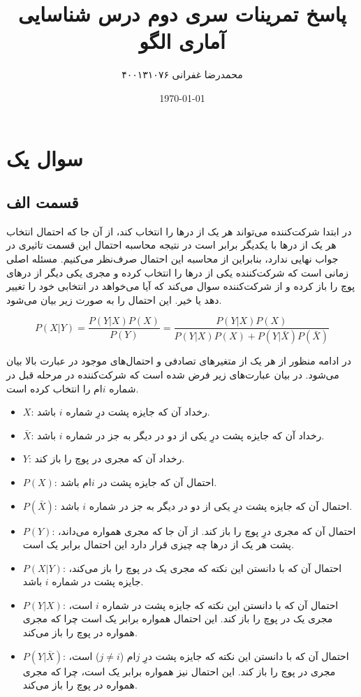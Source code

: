 \documentclass{article}
\title{\vspace{-4cm} \textbf{پاسخ تمرینات سری دوم درس شناسایی آماری الگو}}
\author{محمدرضا غفرانی  ۴۰۰۱۳۱۰۷۶}
\date{\today}
\begin{document}
\maketitle

\section*{سوال یک}

\subsection*{قسمت الف}

در ابتدا شرکت‌کننده می‌تواند هر یک از در‌ها را انتخاب کند، از آن جا که احتمال انتخاب هر یک از در‌ها با
یکدیگر برابر است در نتیجه محاسبه احتمال این قسمت تاثیری در جواب نهایی ندارد، بنابراین از
محاسبه این احتمال صرف‌نظر می‌کنیم. مسئله اصلی زمانی است که شرکت‌کننده یکی از در‌ها را انتخاب کرده و
مجری یکی دیگر از در‌های پوچ را باز کرده و از شرکت‌کننده سوال می‌کند که آیا
می‌خواهد در انتخابی خود را تغییر دهد یا خیر. این احتمال را به صورت زیر بیان می‌شود.

$$P(X|Y) = \frac{P(Y|X) P(X)}{P(Y)} = \frac{P(Y|X) P(X)}{P(Y|X) P(X) + P(Y|\bar{X})P(\bar{X})}$$

در ادامه منظور از هر یک از متغیر‌های تصادفی و احتمال‌های موجود در عبارت بالا بیان می‌شود. در بیان عبارت‌های
زیر فرض شده است که شرکت‌کننده در مرحله قبل در شماره $i$ام را انتخاب کرده است.

\begin{itemize}
    \item $X$: رخداد آن که جایزه پشت درِ شماره $i$ باشد.
    \item $\bar{X}$: رخداد آن که جایزه پشت درِ یکی از دو در دیگر به جز در شماره $i$ باشد.
    \item $Y$: رخداد آن که مجری در پوچ را باز کند.
    \item $P(X)$: احتمال آن که جایزه پشت در $i$ام باشد.
    \item $P(\bar{X})$: احتمال آن که جایزه پشت درِ یکی از دو در دیگر به جز در شماره $i$ باشد.
    \item $P(Y)$: احتمال آن که مجری درِ پوچ را باز کند. از آن جا که مجری همواره می‌داند،
    پشت هر یک از در‌ها چه چیزی قرار دارد این احتمال برابر یک است.
    \item $P(X|Y)$: احتمال آن که با دانستن این نکته که مجری یک در پوچ را باز می‌کند، جایزه پشت در شماره
    $i$ باشد.
    \item $P(Y|X)$: احتمال آن که با دانستن این نکته که جایزه پشت در شماره $i$ است، مجری یک در
    پوچ را باز کند. این احتمال همواره برابر یک است چرا که مجری همواره در پوچ را باز می‌کند.
    \item $P(Y|\bar{X})$: احتمال آن که با دانستن این نکته که جایزه پشت درِ $j$ام ($j \ne i$) است،
    مجری در پوچ را باز کند. این احتمال نیز همواره برابر یک است، چرا که مجری همواره در پوچ را باز می‌کند.
\end{itemize}
\end{document}
